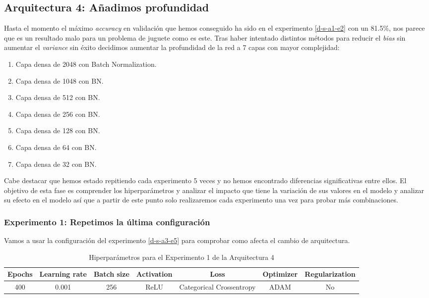 \documentclass{article}
\begin{document}
	\subsection{Arquitectura 4: A\~nadimos profundidad}
	\label{d-s-a4}
		Hasta el momento el m\'aximo \textit{accuracy} en validaci\'on que hemos conseguido ha sido en el experimento \ref{d-s-a1-e2} con un 81.5\%, nos parece que es un resultado malo para un problema de juguete como es este. Tras haber intentado distintos m\'etodos para reducir el \textit{bias} sin aumentar el \textit{variance} sin \'exito decidimos aumentar la profundidad de la red a 7 capas con mayor complejidad:
		\begin{enumerate}
			\item Capa densa de 2048 con Batch Normalization.
			\item Capa densa de 1048 con BN.
			\item Capa densa de 512 con BN.
			\item Capa densa de 256 con BN.
			\item Capa densa de 128 con BN.
			\item Capa densa de 64 con BN.
			\item Capa densa de 32 con BN.
		\end{enumerate}
		
		Cabe destacar que hemos estado repitiendo cada experimento 5 veces y no hemos encontrado diferencias significativas entre ellos. El objetivo de esta fase es comprender los hiperpar\'ametros y analizar el impacto que tiene la variaci\'on de sus valores en el modelo y analizar su efecto en el modelo as\'i que a partir de este punto solo realizaremos cada experimento una vez para probar m\'as combinaciones.
		
		\subsubsection{Experimento 1: Repetimos la \'ultima configuraci\'on}
		\label{d-s-a4-e1}
			Vamos a usar la configuraci\'on del experimento \ref{d-s-a3-e5} para comprobar como afecta el cambio de arquitectura.
			\begin{table}[!h]
				\begin{tabular}{| c | c | c | c | c | c | c |}
					\textbf{Epochs} & \textbf{Learning rate} & \textbf{Batch size} & \textbf{Activation} & \textbf{Loss} & \textbf{Optimizer} & \textbf{Regularization} \\ \hline
					400 & 0.001 & 256 & ReLU & Categorical Crossentropy & ADAM & No
				\end{tabular}
				\caption{Hiperpar\'ametros para el Experimento 1 de la Arquitectura 4}
				\label{tab:hip-d-a4-e1}
			\end{table}
\end{document}
